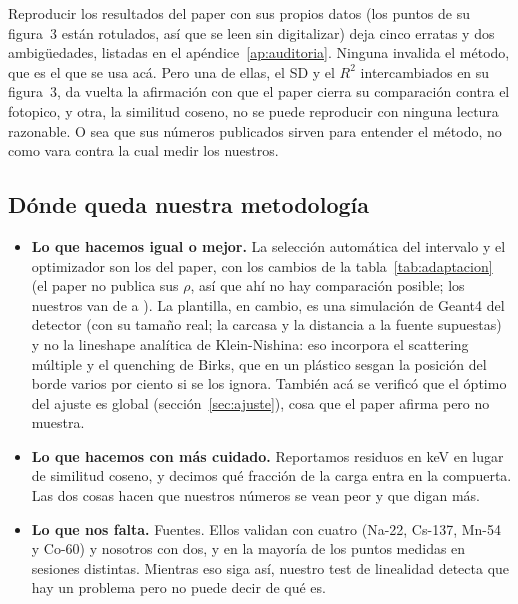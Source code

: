 \documentclass[11pt,a4paper]{article}
\begin{document}
Reproducir los resultados del paper con sus propios datos (los puntos de su
figura~3 están rotulados, así que se leen sin digitalizar) deja cinco
erratas y dos ambigüedades, listadas en el
apéndice~\ref{ap:auditoria}. Ninguna invalida el método, que es el que se
usa acá. Pero una de ellas, el SD y el $R^2$ intercambiados en su figura~3,
da vuelta la afirmación con que el paper cierra su comparación contra el
fotopico, y otra, la similitud coseno, no se puede reproducir con ninguna
lectura razonable. O sea que sus números publicados sirven para entender el
método, no como vara contra la cual medir los nuestros.

\subsection{Dónde queda nuestra metodología}

\begin{itemize}
\item \textbf{Lo que hacemos igual o mejor.} La selección automática del
      intervalo y el optimizador son los del paper, con los cambios de la
      tabla~\ref{tab:adaptacion} (el paper no publica sus $\rho$,
      así que ahí no hay comparación posible; los nuestros van de \RhoMin{} a
      \RhoMax). La plantilla, en cambio, es una simulación de Geant4 del
      detector (con su tamaño real; la carcasa y la distancia a la fuente
      supuestas) y no la lineshape analítica de Klein-Nishina: eso
      incorpora el scattering múltiple y el quenching de Birks, que en un
      plástico sesgan la posición del borde varios por ciento si se los ignora.
      También acá se verificó que el óptimo del ajuste es global
      (sección~\ref{sec:ajuste}), cosa que el paper afirma pero no muestra.
\item \textbf{Lo que hacemos con más cuidado.} Reportamos residuos en keV en
      lugar de similitud coseno, y decimos qué fracción de la carga entra en la
      compuerta. Las dos cosas hacen que nuestros números se vean peor y que
      digan más.
\item \textbf{Lo que nos falta.} Fuentes. Ellos validan con cuatro (Na-22,
      Cs-137, Mn-54 y Co-60) y nosotros con dos, y en la mayoría de los puntos
      medidas en sesiones distintas. Mientras eso siga así, nuestro test de
      linealidad detecta que hay un problema pero no puede decir de qué es.
\end{itemize}

\end{document}
